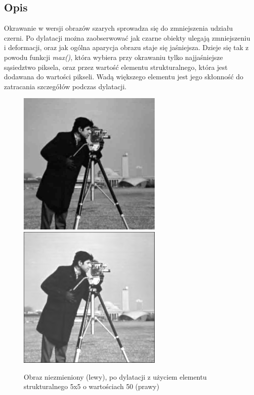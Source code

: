 \documentclass[a4paper,12pt]{book}
\begin{document}
\subsection{Opis}
	Okrawanie w wersji obrazów szarych sprowadza się do zmniejszenia udziału czerni. Po dylatacji można zaobserwować jak czarne obiekty ulegają zmniejszeniu i deformacji, oraz jak ogólna aparycja obrazu staje się jaśniejsza. Dzieje się tak z powodu funkcji \textit{max()}, która wybiera przy okrawaniu tylko najjaśniejsze sąsiedztwo piksela, oraz przez wartość elementu strukturalnego, która jest dodawana do wartości pikseli. Wadą większego elementu jest jego skłonność do zatracania szczegółów podczas dylatacji. 
\begin{figure}[H]
	\caption{Obraz niezmieniony (lewy), po dylatacji z użyciem elementu strukturalnego 5x5 o wartościach 50 (prawy)}
	\includegraphics[width=7cm, height=7cm]{man-unmodified.jpg}
	\includegraphics[width=7cm, height=7cm]{morph-gray-dilation-strel5x5-50.png}
\end{figure}
\end{document}
